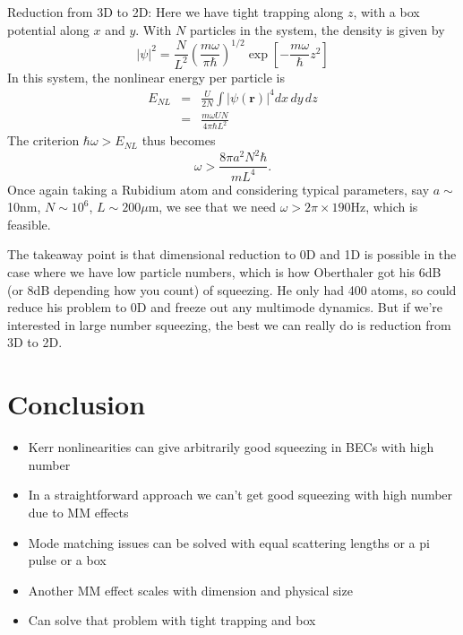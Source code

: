 \documentclass[12pt]{iopart}
\begin{document}
Reduction from 3D to 2D: Here we have tight trapping along $z$, with a box potential along $x$ and $y$. With $N$ particles in the system, the density is given by
\begin{equation}
|\psi|^2 = \frac{N}{L^2} \left( {\frac{m \omega}{\pi \hbar}} \right) ^{1/2} \exp \left[ -\frac{m \omega} {\hbar} z^2  \right]
\end{equation}
In this system, the nonlinear energy per particle is
\begin{eqnarray}
E_{NL} &=& \frac{U}{2N} \int |\psi({\mathbf{r}})|^4 dx \, dy \, dz \\
       &=& \frac{m \omega U N}{4 \pi \hbar L^2}
\end{eqnarray}
The criterion $\hbar \omega > E_{NL}$ thus becomes
\begin{equation}
\omega > \frac{8 \pi a^2 N^2 \hbar}{m L^4}.
\end{equation}
Once again taking a Rubidium atom and considering typical parameters, say $a\sim$10nm, $N\sim 10^6$, $L\sim 200\mu$m, we see that we need $\omega > 2\pi\times 190$Hz, which is feasible.

The takeaway point is that dimensional reduction to 0D and 1D is possible in the case where we have low particle numbers, which is how Oberthaler got his 6dB (or 8dB depending how you count) of squeezing. He only had 400 atoms, so could reduce his problem to 0D and freeze out any multimode dynamics. But if we're interested in large number squeezing, the best we can really do is reduction from 3D to 2D.



\section{Conclusion}
\label{sectionConclusion}
\begin{itemize}
  \item Kerr nonlinearities can give arbitrarily good squeezing in BECs with high number
  \item In a straightforward approach we can't get good squeezing with high number due to MM effects
  \item Mode matching issues can be solved with equal scattering lengths or a pi pulse or a box
  \item Another MM effect scales with dimension and physical size
  \item Can solve that problem with tight trapping and box
\end{itemize}
\end{document}
